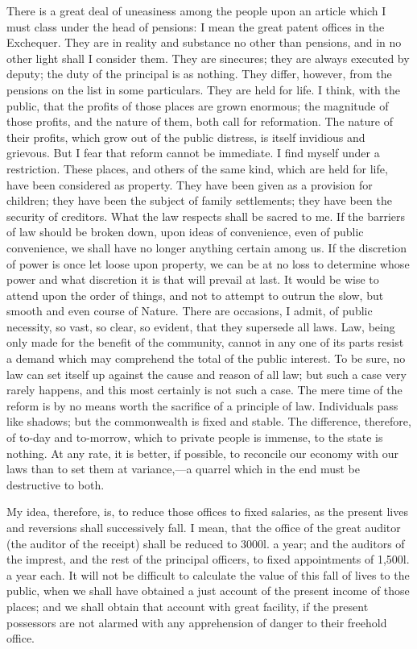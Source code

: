 There is a great deal of uneasiness among the people upon an article which I must class under the head of pensions: I mean the great patent offices in the Exchequer. They are in reality and substance no other than pensions, and in no other light shall I consider them. They are sinecures; they are always executed by deputy; the duty of the principal is as nothing. They differ, however, from the pensions on the list in some particulars. They are held for life. I think, with the public, that the profits of those places are grown enormous; the magnitude of those profits, and the nature of them, both call for reformation. The nature of their profits, which grow out of the public distress, is itself invidious and grievous. But I fear that reform cannot be immediate. I find myself under a restriction. These places, and others of the same kind, which are held for life, have been considered as property. They have been given as a provision for children; they have been the subject of family settlements; they have been the security of creditors. What the law respects shall be sacred to me. If the barriers of law should be broken down, upon ideas of convenience, even of public convenience, we shall have no longer anything certain among us. If the discretion of power is once let loose upon property, we can be at no loss to determine whose power and what discretion it is that will prevail at last. It would be wise to attend upon the order of things, and not to attempt to outrun the slow, but smooth and even course of Nature. There are occasions, I admit, of public necessity, so vast, so clear, so evident, that they supersede all laws. Law, being only made for the benefit of the community, cannot in any one of its parts resist a demand which may comprehend the total of the public interest. To be sure, no law can set itself up against the cause and reason of all law; but such a case very rarely happens, and this most certainly is not such a case. The mere time of the reform is by no means worth the sacrifice of a principle of law. Individuals pass like shadows; but the commonwealth is fixed and stable. The difference, therefore, of to-day and to-morrow, which to private people is immense, to the state is nothing. At any rate, it is better, if possible, to reconcile our economy with our laws than to set them at variance,—a quarrel which in the end must be destructive to both.

My idea, therefore, is, to reduce those offices to fixed salaries, as the present lives and reversions shall successively fall. I mean, that the office of the great auditor (the auditor of the receipt) shall be reduced to 3000l. a year; and the auditors of the imprest, and the rest of the principal officers, to fixed appointments of 1,500l. a year each. It will not be difficult to calculate the value of this fall of lives to the public, when we shall have obtained a just account of the present income of those places; and we shall obtain that account with great facility, if the present possessors are not alarmed with any apprehension of danger to their freehold office.

